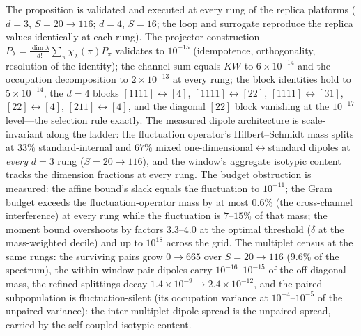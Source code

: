 \documentclass[11pt,a4paper]{article}
\theoremstyle{plain}
\theoremstyle{definition}
\theoremstyle{remark}
\begin{document}
The proposition is validated and executed at every rung of the replica
platforms ($d=3$, $S=20\to116$; $d=4$, $S=16$; the loop and surrogate
reproduce the replica values identically at each rung). The projector
construction $P_{\lambda}=\tfrac{\dim\lambda}{d!}\sum_{\pi}
\chi_{\lambda}(\pi)P_{\pi}$ validates to $10^{-15}$ (idempotence,
orthogonality, resolution of the identity); the channel sum equals $KW$
to $6\times10^{-14}$ and the occupation decomposition to
$2\times10^{-13}$ at every rung; the block identities hold to
$5\times10^{-14}$, the $d=4$ blocks $[1111]\leftrightarrow[4]$,
$[1111]\leftrightarrow[22]$, $[1111]\leftrightarrow[31]$,
$[22]\leftrightarrow[4]$, $[211]\leftrightarrow[4]$, and the diagonal
$[22]$ block vanishing at the $10^{-17}$ level---the selection rule
exactly. The measured dipole architecture is scale-invariant along the
ladder: the fluctuation operator's Hilbert--Schmidt mass splits at
$33\%$ standard-internal and $67\%$ mixed
one-dimensional$\leftrightarrow$standard dipoles at \emph{every} $d=3$
rung ($S=20\to116$), and the window's aggregate isotypic content tracks
the dimension fractions at every rung. The budget obstruction is
measured: the affine bound's slack equals the fluctuation to
$10^{-11}$; the Gram budget exceeds the fluctuation-operator mass by at
most $0.6\%$ (the cross-channel interference) at every rung while the
fluctuation is $7$--$15\%$ of that mass; the moment bound overshoots by
factors $3.3$--$4.0$ at the optimal threshold ($\delta$ at the
mass-weighted decile) and up to $10^{18}$ across the grid. The
multiplet census at the same rungs: the surviving pairs grow $0\to665$
over $S=20\to116$ ($9.6\%$ of the spectrum), the within-window pair
dipoles carry $10^{-16}$--$10^{-15}$ of the off-diagonal mass, the
refined splittings decay $1.4\times10^{-9}\to2.4\times10^{-12}$, and
the paired subpopulation is fluctuation-silent (its occupation variance
at $10^{-4}$--$10^{-5}$ of the unpaired variance): the inter-multiplet
dipole spread is the unpaired spread, carried by the self-coupled
isotypic content.
\end{document}
